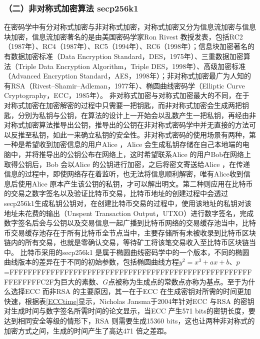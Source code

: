 				\subsubsection{（二）非对称式加密算法 secp256k1}
				在密码学中有分对称式加密与非对称式加密，对称式加密又分为信息流加密与信息块加密，信息流加密著名的是由美国密码学家Ron Rivest 教授发表，包括RC2（1987年）\supercite{OnthedesignandsecurityofRC2}、RC4（1987年）\supercite{Rc4}、RC5（1994年）\supercite{TheRC5encryptionalgorithm}、RC6（1998年）\supercite{TheRC6blockcipher.v1.1August201998}；信息块加密著名的有数据加密标准（Data Encryption Standard，DES，1975年）\supercite{Dataencryptionstandard}、三重数据加密算法（Triple Data Encryption Algorithm，Triple DES，1998年）\supercite{TrippleDataEncryptionAlgorithmModesofOperation}、高级加密标准（Advanced Encryption Standard，AES，1998年）\supercite{ThedesignofRijndael:AES-theadvancedencryptionstandard}；非对称式加密最广为人知的有RSA（Rivest–Shamir–Adleman，1977年）\supercite{Cryptographiccommunicationssystemandmethod}、椭圆曲线密码学（Elliptic Curve Cryptography，ECC，1985年）\supercite{Ellipticcurvecryptosystems}。
				非对称式加密与对称式加密最大的不同，在于对称式加密在加密解密的过程中只需要一把钥匙，而非对称式加密会生成两把钥匙，分别为私钥与公钥，在算法的设计上一开始会以乱数产生一把私钥，再经由非对称式加密算法推导出公钥，推导出的公钥在非对称式密码学中并无直接的方法可以反推至私钥，如此一来确立私钥的安全性。非对称式密码的使用场景有两种，第一种是希望收到加密信息的用户Alice ，Alice 会生成私钥存储在自己本地端的电脑中，并将推导出的公钥公布在网络上，这时希望联系Alice 的用户Bob在网络上取得公钥后，Bob 会以Alice 的公钥进行加密，之后将密文寄送给Alice ，在传递信息的过程中，即使网络存在着监听，也无法将信息顺利解密，唯有Alice收到信息后使用Alice 原本产生该公钥的私钥，才可以解出明文。第二种则应用在比特币的交易之数字签名以及验证比特币交易，比特币地址的创建过程中会透过secp256k1生成私钥公钥对，在创建比特币交易的过程中，使用该地址的私钥对该地址未花费的输出（Unspent Transaction Output，UTXO）\supercite{bitcoinpaper}进行数字签名，完成数字签名后会与公钥以及交易信息一起广播到比特币网络的交易缓存池当中，比特币交易缓存池存在于所有比特币全节点当中，主要存储所有未被收录到比特币区块链内的所有交易，也就是零确认交易，等待矿工将该笔交易收入至比特币区块链当中。
				比特币采用的secp256k1 是属于椭圆曲线密码学中的一个版本，不同的椭圆曲线版本的差异在于不同的初始参数，包括椭圆曲线方程$y^2=x^3+ax+b$、$p$=FFFFFFFFFFFFFFFFFFFFFFFFFFFFFFFFFFFFFFFFFFFFFFFFFFFFFFFEFFFFFC2F为巨大的素数、$G$点被称为⽣成点的常数点亦称为基点。至于为什么选择ECC 而非RSA 的主要原因，其一在于ECC 在生成密钥对所需的时间更加快速，根据表\ref{ECCtime}显示，Nicholas Jansma于2004年针对ECC 与RSA 的密钥对生成时间与数字签名所需时间的论文\supercite{Performancecomparisonofellipticcurveandrsadigitalsignatures}显示，当ECC 产生571 bits的密钥长度，要达到相同安全等级的情形下，RSA 则需要⽣成15360 bits，这也让两种非对称式的加密方式之间，⽣成的时间产生了⾼达471 倍之差距。

